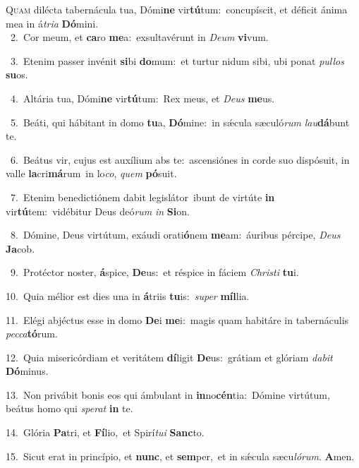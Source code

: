 \lettrine{\initial\textcolor{\initialcolor}{Q}}{uam} dilécta tabernácula tua, Dómi\textbf{ne} vir\-\textbf{tú}\-tum:~\star concupíscit, et déficit ánima mea in á\-\textit{tri}\-\textit{a} \textbf{Dó}\-mini.\\
{\numbfont\textcolor{\numbcolor}{~2.}}~Cor meum, et \textbf{ca}\-ro \textbf{me}\-a:~\star exsultavérunt in \textit{De}\-\textit{um} \textbf{vi}\-vum.\par
{\numbfont\textcolor{\numbcolor}{~3.}}~Etenim passer invénit \textbf{si}\-bi \textbf{do}\-mum:~\star et turtur nidum sibi, ubi ponat \textit{pul}\-\textit{los} \textbf{su}\-os.\par
{\numbfont\textcolor{\numbcolor}{~4.}}~Altária tua, Dómi\textbf{ne} vir\-\textbf{tú}\-tum:~\star Rex meus, et \textit{De}\-\textit{us} \textbf{me}\-us.\par
{\numbfont\textcolor{\numbcolor}{~5.}}~Beáti, qui hábitant in domo \textbf{tu}\-a, \textbf{Dó}\-mine:~\star in sǽcula sæculó\textit{rum} \textit{lau}\-\textbf{dá}bunt te.\par
{\numbfont\textcolor{\numbcolor}{~6.}}~Beátus vir, cujus est auxílium abs te:~\dagger ascensiónes in corde suo dispósuit, in valle \textbf{la}\-cri\-\textbf{má}\-rum~\star in lo\-\textit{co}\-, \textit{quem} \textbf{pó}\-suit.\par
{\numbfont\textcolor{\numbcolor}{~7.}}~Etenim benedictiónem dabit legislátor~\dagger ibunt de virtúte \textbf{in} vir\-\textbf{tú}\-tem:~\star vidébitur Deus deó\textit{rum} \textit{in} \textbf{Si}\-on.\par
{\numbfont\textcolor{\numbcolor}{~8.}}~Dómine, Deus virtútum, exáudi orati\-\textbf{ó}\-nem \textbf{me}\-am:~\star áuribus pércipe, \textit{De}\-\textit{us} \textbf{Ja}\-cob.\par
{\numbfont\textcolor{\numbcolor}{~9.}}~Protéctor noster, \textbf{á}\-spice, \textbf{De}\-us:~\star et réspice in fáciem \textit{Chris}\-\textit{ti} \textbf{tu}\-i.\par
{\numbfont\textcolor{\numbcolor}{10.}}~Quia mélior est dies una in \textbf{á}\-triis \textbf{tu}\-is:~\star \textit{su}\-\textit{per} \textbf{míl}\-lia.\par
{\numbfont\textcolor{\numbcolor}{11.}}~Elégi abjéctus esse in domo \textbf{De}\-i \textbf{me}\-i:~\star magis quam habitáre in tabernáculis \textit{pec}\-\textit{ca}\textbf{tó}rum.\par
{\numbfont\textcolor{\numbcolor}{12.}}~Quia misericórdiam et veritátem \textbf{dí}\-ligit \textbf{De}\-us:~\star grátiam et glóriam \textit{da}\-\textit{bit} \textbf{Dó}\-minus.\par
{\numbfont\textcolor{\numbcolor}{13.}}~Non privábit bonis eos qui ámbulant in \textbf{in}\-no\-\textbf{cén}\-tia:~\star Dómine virtútum, beátus homo qui \textit{spe}\-\textit{rat} \textbf{in} te.\par
{\numbfont\textcolor{\numbcolor}{14.}}~Glória \textbf{Pa}\-tri, et \textbf{Fí}\-lio,~\star et Spirí\-\textit{tu}\-\textit{i} \textbf{Sanc}\-to.\par
{\numbfont\textcolor{\numbcolor}{15.}}~Sicut erat in princípio, et \textbf{nunc}\-, et \textbf{sem}\-per,~\star et in sǽcula sæcu\-\textit{ló}\-\textit{rum}. \textbf{A}\-men.\par
